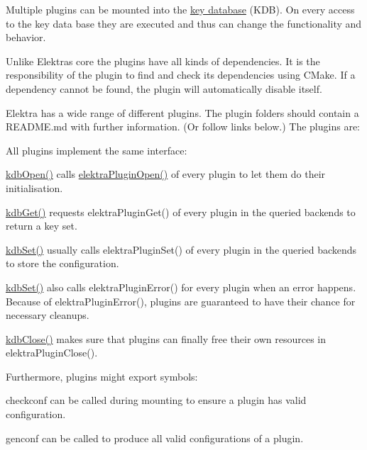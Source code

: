 Multiple plugins can be mounted into the \hyperlink{doc_help_elektra-glossary_md}{key database} (K\+DB). On every access to the key data base they are executed and thus can change the functionality and behavior.

Unlike Elektra\textquotesingle{}s core the plugins have all kinds of dependencies. It is the responsibility of the plugin to find and check its dependencies using C\+Make. If a dependency cannot be found, the plugin will automatically disable itself.

Elektra has a wide range of different plugins. The plugin folders should contain a R\+E\+A\+D\+M\+E.\+md with further information. (Or follow links below.) The plugins are\+:

 

All plugins implement the same interface\+:


\begin{DoxyItemize}
\item {\ttfamily \hyperlink{group__kdb_ga6808defe5870f328dd17910aacbdc6ca}{kdb\+Open()}} calls {\ttfamily \hyperlink{elektra_2plugin_8c_a32a70a7876542c51d153164ac5108a57}{elektra\+Plugin\+Open()}} of every plugin to let them do their initialisation.
\item {\ttfamily \hyperlink{group__kdb_ga28e385fd9cb7ccfe0b2f1ed2f62453a1}{kdb\+Get()}} requests {\ttfamily elektra\+Plugin\+Get()} of every plugin in the queried backends to return a key set.
\item {\ttfamily \hyperlink{group__kdb_ga11436b058408f83d303ca5e996832bcf}{kdb\+Set()}} usually calls {\ttfamily elektra\+Plugin\+Set()} of every plugin in the queried backends to store the configuration.
\item {\ttfamily \hyperlink{group__kdb_ga11436b058408f83d303ca5e996832bcf}{kdb\+Set()}} also calls {\ttfamily elektra\+Plugin\+Error()} for every plugin when an error happens. Because of {\ttfamily elektra\+Plugin\+Error()}, plugins are guaranteed to have their chance for necessary cleanups.
\item {\ttfamily \hyperlink{group__kdb_gadb54dc9fda17ee07deb9444df745c96f}{kdb\+Close()}} makes sure that plugins can finally free their own resources in {\ttfamily elektra\+Plugin\+Close()}.
\end{DoxyItemize}

Furthermore, plugins might export symbols\+:


\begin{DoxyItemize}
\item {\ttfamily checkconf} can be called during mounting to ensure a plugin has valid configuration.
\item {\ttfamily genconf} can be called to produce all valid configurations of a plugin.
\end{DoxyItemize}


